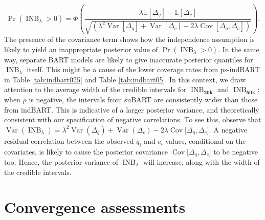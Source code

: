 \documentclass[aoas,preprint]{imsart}
\theoremstyle{plain}
\theoremstyle{definition}
\theoremstyle{remark}
\begin{document}
\begin{appendix}
\[
\Pr\left(\operatorname{INB}_{\lambda} > 0\right) = \Phi \left(\!\frac{\lambda \mathbb{E} \left\lbrack \Delta_q \right\rbrack - \mathbb{E} \left\lbrack \Delta_c \right\rbrack}{\sqrt{\left(\lambda^2 \operatorname{Var}\left\lbrack \Delta_q \right\rbrack + \operatorname{Var}\left\lbrack \Delta_c \right\rbrack - 2 \lambda \operatorname{Cov}\left\lbrack \Delta_q, \Delta_c \right\rbrack \right)}}\!\right).
\]
The presence of the covariance term shows how the independence assumption is likely to yield an inappropriate posterior value of $\Pr\left(\operatorname{INB}_{\lambda} > 0\right)$. In the same way, separate BART models are likely to give inaccurate posterior quantiles for $\operatorname{INB}_{\lambda}$ itself. This might be a cause of the lower coverage rates from ps-indBART in Table \ref{tab:indbart025} and Table \ref{tab:indbart05}.
In this context, we draw attention to the average width of the credible intervals for $\operatorname{INB}_{\mathbf{20k}}$ and $\operatorname{INB}_{\mathbf{50k}}$: when $\rho$ is negative, the intervals from suBART are consistently wider than those from indBART. This is indicative of a larger posterior variance, and theoretically consistent with our specification of negative correlations. 
To see this, observe that $\operatorname{Var}( \operatorname{INB}_{\lambda}) = \lambda^2 \operatorname{Var}(\Delta_q) + \operatorname{Var}(\Delta_c) - 2 \lambda \operatorname{Cov}\lbrack \Delta_q, \Delta_c\rbrack$.
A negative residual correlation between the observed $q_i$ and $c_i$ values, conditional on the covariates, is likely to cause the posterior covariance $\operatorname{Cov}\lbrack \Delta_q, \Delta_c\rbrack$ to be negative too. Hence, the posterior variance of $\operatorname{INB}_{\lambda}$ will increase, along with the width of the credible intervals. 

\setcounter{figure}{0}
\setcounter{table}{0}
\section{Convergence assessments}\label{app:convergence}


\end{appendix}
\end{document}

